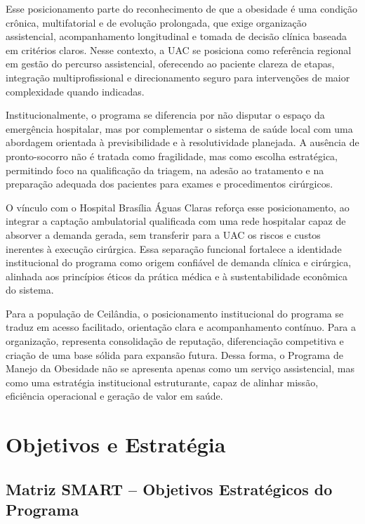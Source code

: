 \documentclass[12pt]{article}
\begin{document}
Esse posicionamento parte do reconhecimento de que a obesidade é uma condição crônica, multifatorial e de evolução prolongada, que exige organização assistencial, acompanhamento longitudinal e tomada de decisão clínica baseada em critérios claros. Nesse contexto, a UAC se posiciona como referência regional em gestão do percurso assistencial, oferecendo ao paciente clareza de etapas, integração multiprofissional e direcionamento seguro para intervenções de maior complexidade quando indicadas.

Institucionalmente, o programa se diferencia por não disputar o espaço da emergência hospitalar, mas por complementar o sistema de saúde local com uma abordagem orientada à previsibilidade e à resolutividade planejada. A ausência de pronto-socorro não é tratada como fragilidade, mas como escolha estratégica, permitindo foco na qualificação da triagem, na adesão ao tratamento e na preparação adequada dos pacientes para exames e procedimentos cirúrgicos.

O vínculo com o Hospital Brasília Águas Claras reforça esse posicionamento, ao integrar a captação ambulatorial qualificada com uma rede hospitalar capaz de absorver a demanda gerada, sem transferir para a UAC os riscos e custos inerentes à execução cirúrgica. Essa separação funcional fortalece a identidade institucional do programa como origem confiável de demanda clínica e cirúrgica, alinhada aos princípios éticos da prática médica e à sustentabilidade econômica do sistema.

Para a população de Ceilândia, o posicionamento institucional do programa se traduz em acesso facilitado, orientação clara e acompanhamento contínuo. Para a organização, representa consolidação de reputação, diferenciação competitiva e criação de uma base sólida para expansão futura. Dessa forma, o Programa de Manejo da Obesidade não se apresenta apenas como um serviço assistencial, mas como uma estratégia institucional estruturante, capaz de alinhar missão, eficiência operacional e geração de valor em saúde.

\FGVNewPage

\section{Objetivos e Estratégia}
\label{sec:orge5e4898}
\subsection{Matriz SMART – Objetivos Estratégicos do Programa}
\label{sec:orge544f60}
\end{document}
